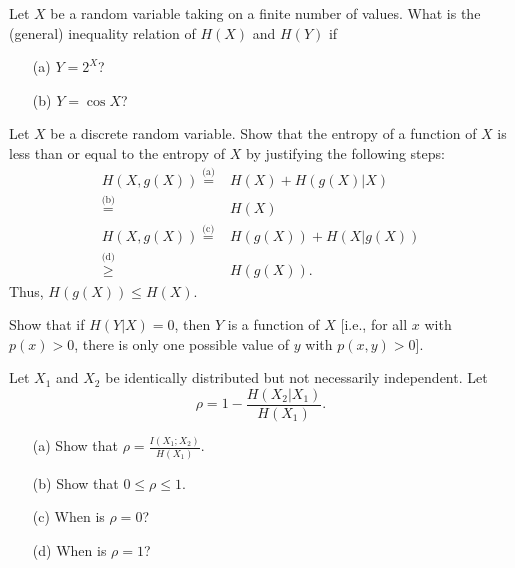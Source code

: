 \documentclass{assignment}
\begin{document}
\begin{prob}
    Let $X$ be a random variable taking on a finite number of values. What is the (general) inequality relation of $H(X)$ and $H(Y)$ if
    \begin{itemize}
        \item[(a)] $Y=2^X$?
        \item[(b)] $Y=\cos X$?
    \end{itemize}
\end{prob}
\begin{sol}
\end{sol}

\begin{prob}
    Let $X$ be a discrete random variable. Show that the entropy of a function of $X$ is less than or equal to the entropy of $X$ by justifying the following steps:
    \begin{align*}
        H(X,g(X))\overset{\text{(a)}}{=}&H(X)+H(g(X)\vert X)\\
        \overset{\text{(b)}}{=}&H(X)\\
        H(X,g(X))\overset{\text{(c)}}{=}&H(g(X))+H(X\vert g(X))\\
        \overset{\text{(d)}}{\geq}&H(g(X)).
    \end{align*}
    Thus, $H(g(X))\leq H(X)$.
\end{prob}
\begin{sol}
\end{sol}

\begin{prob}
    Show that if $H(Y\vert X)=0$, then $Y$ is a function of $X$ [i.e., for all $x$ with $p(x)>0$, there is only one possible value of $y$ with $p(x,y)>0$].
\end{prob}
\begin{sol}
\end{sol}

\begin{prob}
    Let $X_1$ and $X_2$ be identically distributed but not necessarily independent. Let
    \[
        \rho=1-\frac{H(X_2\vert X_1)}{H(X_1)}.
    \]
    \begin{itemize}
        \item[(a)] Show that $\rho=\frac{I(X_1;X_2)}{H(X_1)}$.
        \item[(b)] Show that $0\leq\rho\leq 1$.
        \item[(c)] When is $\rho=0$?
        \item[(d)] When is $\rho=1$?
    \end{itemize}
\end{prob}
\begin{sol}
\end{sol}
\end{document}
